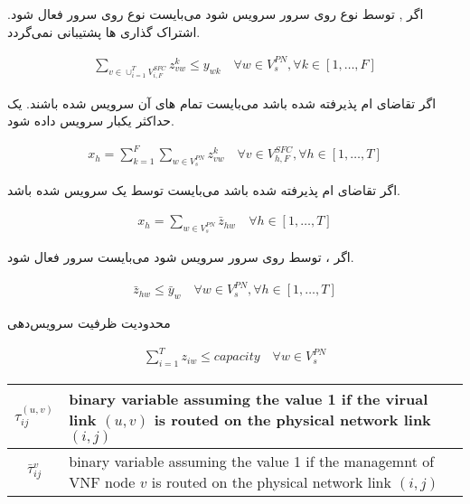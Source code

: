 اگر , 
توسط  نوع 
روی سرور  سرویس شود می‌بایست
 نوع 
روی سرور  فعال شود.
اشتراک گذاری ها پشتیبانی نمی‌گردد.
\begin{latin}\begin{align}
\sum_{v \in \cup_{i=1}^T V_{i, F}^{SFC}} z_{vw}^k \le y_{wk}
\quad
\forall w \in V_s^{PN}, \forall k \in [1,\ldots, F]
\end{align}\end{latin}

اگر تقاضای ام پذیرفته شده باشد
می‌بایست تمام های آن‌
سرویس شده باشند.
یک  حداکثر یکبار سرویس داده شود.
\begin{latin}\begin{align}
    x_h = \sum_{k=1}^{F} \sum_{w \in V_{s}^{PN}} z_{vw}^{k}
    \quad
    \forall v \in V_{h,F}^{SFC}, \forall h \in [1,\ldots, T]
\end{align}\end{latin}

اگر تقاضای ام پذیرفته شده باشد
می‌بایست توسط یک  سرویس شده باشد.
\begin{latin}\begin{align}
    x_h = \sum_{w \in V_{s}^{PN}} \bar{z}_{hw}
    \quad
    \forall h \in [1,\ldots, T]
\end{align}\end{latin}

اگر ، 
توسط  روی سرور 
سرویس شود می‌بایست  سرور 
فعال شود.
\begin{latin}\begin{align}
    \bar{z}_{hw} \le \bar{y}_w
    \quad
    \forall w \in V_{s}^{PN}, \forall h \in [1,\ldots, T]
\end{align}\end{latin}

محدودیت ظرفیت سرویس‌دهی 
\begin{latin}\begin{align}
    \sum_{i=1}^{T} z_{iw} \le capacity
    \quad
    \forall w \in V_{s}^{PN}
\end{align}\end{latin}

\begin{center}\begin{latin}\begin{tabular}{|c|p{10cm}|}
    \hline
    $\tau^{(u,v)}_{ij}$ & binary variable assuming the value 1 if the virual link $(u,v)$ is routed on the physical network link $(i,j)$\\
    \hline
    $\bar{\tau}^{v}_{ij}$ & binary variable assuming the value 1 if the managemnt of VNF node $v$ is routed on the physical network link $(i,j)$\\
    \hline
\end{tabular}\end{latin}\end{center}

